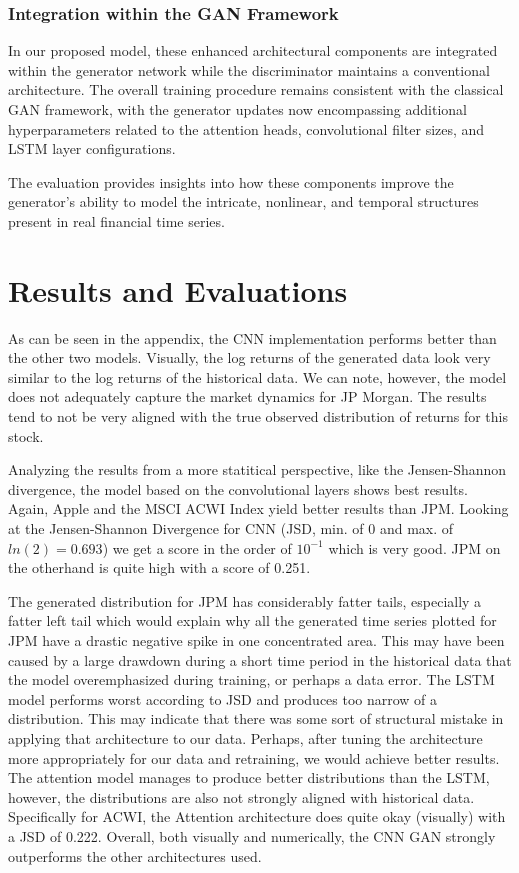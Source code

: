 \documentclass{article}
\begin{document}
\subsubsection*{Integration within the GAN Framework}

In our proposed model, these enhanced architectural components are integrated within the generator network while the discriminator maintains a conventional architecture. The overall training procedure remains consistent with the classical GAN framework, with the generator updates now encompassing additional hyperparameters related to the attention heads, convolutional filter sizes, and LSTM layer configurations.

The evaluation provides insights into how these components improve the generator's ability to model the intricate, nonlinear, and temporal structures present in real financial time series.


\section{Results and Evaluations}

As can be seen in the appendix, the CNN implementation performs better than the other two models. Visually, the log returns of the generated data look very similar to the log returns of the historical data. We can note, however, the model does not adequately capture the market dynamics for JP Morgan. The results tend to not be very aligned with the true observed distribution of returns for this stock.

Analyzing the results from a more statitical perspective, like the Jensen-Shannon divergence, the model based on the convolutional layers shows best results. Again, Apple and the MSCI ACWI Index yield better results than JPM. Looking at the Jensen-Shannon Divergence for CNN (JSD, min. of 0 and max. of $ ln(2) = 0.693 $) we get a score in the order of $ 10^{-1} $ which is very good. JPM on the otherhand is quite high with a score of 0.251.

The generated distribution for JPM has considerably fatter tails, especially a fatter left tail which would explain why all the generated time series plotted for JPM have a drastic negative spike in one concentrated area. This may have been caused by a large drawdown during a short time period in the historical data that the model overemphasized during training, or perhaps a data error. The LSTM model performs worst according to JSD and produces too narrow of a distribution. This may indicate that there was some sort of structural mistake in applying that architecture to our data. Perhaps, after tuning the architecture more appropriately for our data and retraining, we would achieve better results. The attention model manages to produce better distributions than the LSTM, however, the distributions are also not strongly aligned with historical data. Specifically for ACWI, the Attention architecture does quite okay (visually) with a JSD of 0.222. Overall, both visually and numerically, the CNN GAN strongly outperforms the other architectures used.
\end{document}
